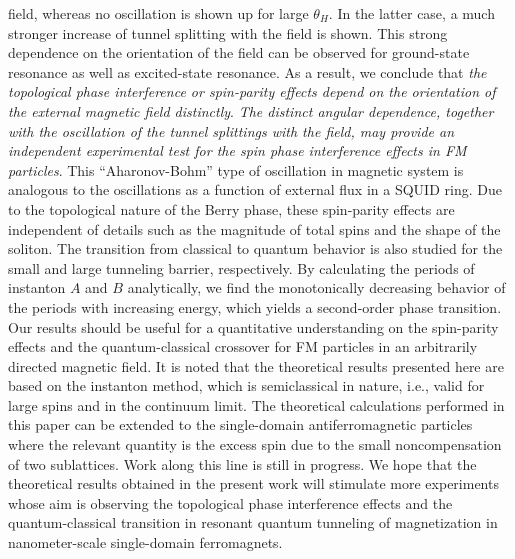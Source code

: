 field, whereas no oscillation is shown up for large $\theta _H$. In the
latter case, a much stronger increase of tunnel splitting with the field is
shown. This strong dependence on the orientation of the field can be
observed for ground-state resonance as well as excited-state resonance. As a
result, we conclude that {\it the topological phase interference or
spin-parity effects depend on the orientation of the external magnetic field
distinctly}. {\it The distinct angular dependence, together with the
oscillation of the tunnel splittings with the field, may provide an
independent experimental test for the spin phase interference effects in FM
particles}. This ``Aharonov-Bohm'' type of oscillation in magnetic system is
analogous to the oscillations as a function of external flux in a SQUID
ring. Due to the topological nature of the Berry phase, these spin-parity
effects are independent of details such as the magnitude of total spins and
the shape of the soliton. The transition from classical to quantum behavior
is also studied for the small and large tunneling barrier, respectively. By
calculating the periods of instanton $A$ and $B$ analytically, we find the
monotonically decreasing behavior of the periods with increasing energy,
which yields a second-order phase transition. Our results should be useful
for a quantitative understanding on the spin-parity effects and the
quantum-classical crossover for FM particles in an arbitrarily directed
magnetic field. It is noted that the theoretical results presented here are
based on the instanton method, which is semiclassical in nature, i.e., valid
for large spins and in the continuum limit. The theoretical calculations
performed in this paper can be extended to the single-domain
antiferromagnetic particles where the relevant quantity is the excess spin
due to the small noncompensation of two sublattices. Work along this line is
still in progress. We hope that the theoretical results obtained in the
present work will stimulate more experiments whose aim is observing the
topological phase interference effects and the quantum-classical transition
in resonant quantum tunneling of magnetization in nanometer-scale
single-domain ferromagnets.


